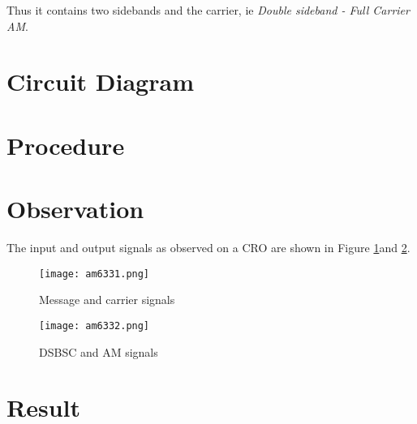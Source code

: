 Thus it contains two sidebands and the carrier, ie \emph{Double sideband - Full Carrier AM}.

\section*{Circuit Diagram}
\section*{Procedure}
\section*{Observation}
The input and output signals as observed on a CRO are shown in Figure \ref{AM633plot1}and \ref{AM633plot2}.
\begin{figure}
\texttt{[image: am6331.png]}
\caption{Message and carrier signals}
\label{AM633plot1}
\end{figure}

\begin{figure}
\texttt{[image: am6332.png]}
\caption{DSBSC and AM signals}
\label{AM633plot2}
\end{figure}


\section*{Result}